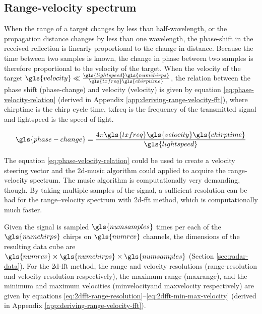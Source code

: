 \subsection{Range-velocity spectrum}
\label{sec:doppler-spectrum}
When the range of a target changes by less than half-wavelength,
or the propagation distance changes by less than one wavelength,
the phase-shift in the received reflection is linearly proportional to the change in distance.
Because the time between two samples is known,
the change in phase between two samples is therefore proportional to the velocity of the target.
When the velocity of the target $\gls{velocity} \ll \frac{\gls{lightspeed}\gls{numchirps}}{\gls{txfreq} \gls{chirptime}}$,
the relation between the phase shift (\gls{phase-change}) and velocity (\gls{velocity}) is given by equation \ref{eq:phase-velocity-relation}
(derived in Appendix \ref{app:deriving-range-velocity-fft}),
where \gls{chirptime} is the chirp cycle time, \gls{txfreq} is the frequency of the transmitted signal and \gls{lightspeed} is the speed of light.

\begin{equation}
    \label{eq:phase-velocity-relation}
    \gls{phase-change} = \frac{4 \pi \gls{txfreq} \gls{velocity} \gls{chirptime}}{\gls{lightspeed}}
\end{equation}

The equation \ref{eq:phase-velocity-relation} could be used to create a velocity steering vector
and the \gls{2d-music} algorithm could applied to acquire the range-velocity spectrum.
The \gls{music} algorithm is computationally very demanding, though.
By taking multiple samples of the signal, a sufficient resolution can be had
for the range--velocity spectrum with \gls{2d-fft} method,
which is computationally much faster.

Given the signal is sampled $\gls{numsamples}$ times per each of the $\gls{numchirps}$ chirps on $\gls{numrcv}$ channels,
the dimensions of the resulting data cube are $\gls{numrcv} \times \gls{numchirps} \times \gls{numsamples}$ (Section \ref{sec:radar-data}).
For the \gls{2d-fft} method,
the range and velocity resolutions (\gls{range-resolution} and \gls{velocity-resolution} respectively),
the maximum range (\gls{maxrange}),
and the minimum and maximum velocities 
(\gls{minvelocity}and \gls{maxvelocity} respectively) are given by equations
\ref{eq:2dfft-range-resolution}--\ref{eq:2dfft-min-max-velocity}
(derived in Appendix \ref{app:deriving-range-velocity-fft}).

